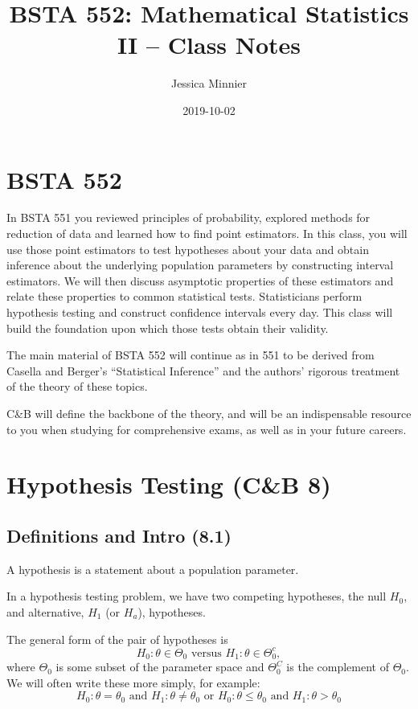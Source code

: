 \documentclass[11pt,]{article}
\title{BSTA 552: Mathematical Statistics II -- Class Notes}
\author{Jessica Minnier}
\date{2019-10-02}
\begin{document}
\maketitle

\hypertarget{bsta-552}{%
\section{BSTA 552}\label{bsta-552}}

In BSTA 551 you reviewed principles of probability, explored methods for
reduction of data and learned how to find point estimators. In this
class, you will use those point estimators to test hypotheses about your
data and obtain inference about the underlying population parameters by
constructing interval estimators. We will then discuss asymptotic
properties of these estimators and relate these properties to common
statistical tests. Statisticians perform hypothesis testing and
construct confidence intervals every day. This class will build the
foundation upon which those tests obtain their validity.

The main material of BSTA 552 will continue as in 551 to be derived from
Casella and Berger's ``Statistical Inference'' and the authors' rigorous
treatment of the theory of these topics.

C\&B will define the backbone of the theory, and will be an
indispensable resource to you when studying for comprehensive exams, as
well as in your future careers.

\newpage

\hypertarget{hypothesis-testing-cb-8}{%
\section{Hypothesis Testing (C\&B 8)}\label{hypothesis-testing-cb-8}}

\hypertarget{definitions-and-intro-8.1}{%
\subsection{Definitions and Intro
(8.1)}\label{definitions-and-intro-8.1}}

 A hypothesis is a statement about a
population parameter.

 In a hypothesis testing problem, we
have two competing hypotheses, the null \(H_0\), and alternative,
\(H_1\) (or \(H_a\)), hypotheses.

The general form of the pair of hypotheses is
\[ H_0 : \theta \in \Theta_0 \mbox{ versus } H_1: \theta \in \Theta^c_0,\]
where \(\Theta_0\) is some subset of the parameter space and
\(\Theta^C_0\) is the complement of \(\Theta_0\). We will often write
these more simply, for example:
\[H_0: \theta = \theta_0 \mbox{ and } H_1: \theta \neq \theta_0 \mbox{ or } H_0: \theta \leq \theta_0 \mbox{ and } H_1: \theta > \theta_0\]
\end{document}
